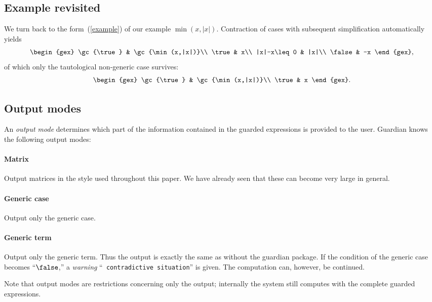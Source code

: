 \subsection{Example revisited}
We turn back to the form~(\ref{example}) of our example $\min(x,|x|)$.
Contraction of cases with subsequent simplification automatically
yields
$$
\begin{gex}
\gc{\true} & \gc{\min(x,|x|)}\\
\true & x\\
|x|-x\leq 0 & |x|\\
\false & -x
\end{gex},
$$
of which only the tautological non-generic case survives:
\begin{equation}
\begin{gex}
\gc{\true} & \gc{\min(x,|x|)}\\
\true & x
\end{gex}.\label{minabs}
\end{equation}

\subsection{Output modes}
An {\em output mode} determines which part of the information
contained in the guarded expressions is provided to the user. {\sc
Guardian} knows the following output modes:

\paragraph{Matrix} Output matrices in the style used throughout this
paper. We have already seen that these can become very large in
general.
\paragraph{Generic case} Output only the generic case.
\paragraph{Generic term} Output only the generic term. Thus the output
is exactly the same as without the guardian package. If the condition
of the generic case becomes ``$\false$,'' a {\em warning} ``{\tt
contradictive situation}'' is given. The computation can, however, be
continued.\bigskip

Note that output modes are restrictions concerning only the output;
internally the system still computes with the complete guarded
expressions.
%
